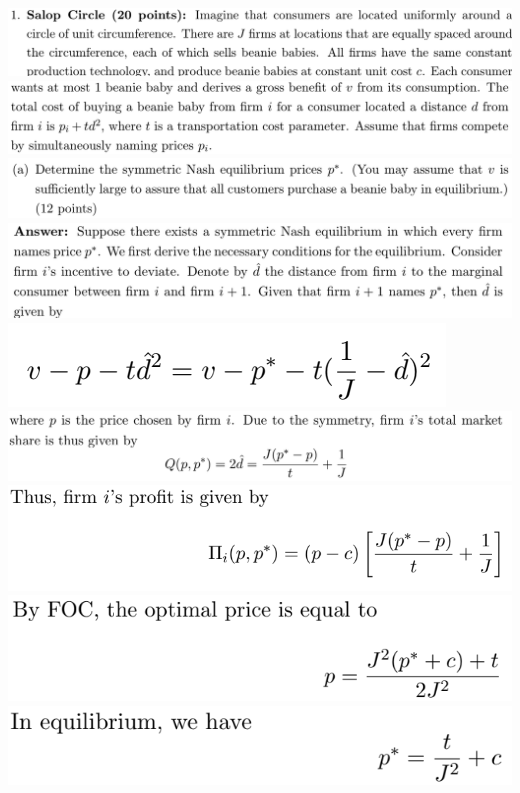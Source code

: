 \documentclass[8pt,landscape]{extarticle}
\begin{document}
\begin{multicols*}{3}
    \includegraphics[width=0.77\linewidth,keepaspectratio]{Screenshots/Screenshot 2024-03-11 171245.png}
    \includegraphics[width=0.75\linewidth,keepaspectratio]{Screenshots/Screenshot 2024-03-11 171249.png}
    \includegraphics[width=0.74\linewidth,keepaspectratio]{Screenshots/Screenshot 2024-03-11 171255.png}
    \includegraphics[width=0.72\linewidth,keepaspectratio]{Screenshots/Screenshot 2024-03-11 171307.png}
    \includegraphics[width=0.29\linewidth,keepaspectratio]{Screenshots/Screenshot 2024-03-11 171310.png}
    \includegraphics[width=0.71\linewidth,keepaspectratio]{Screenshots/Screenshot 2024-03-11 171347.png}
    \includegraphics[width=0.51\linewidth,keepaspectratio]{Screenshots/Screenshot 2024-03-11 171351.png}
    \includegraphics[width=0.44\linewidth,keepaspectratio]{Screenshots/Screenshot 2024-03-11 171355.png}
    \includegraphics[width=0.41\linewidth,keepaspectratio]{Screenshots/Screenshot 2024-03-11 171359.png}

\end{multicols*}
\end{document}
